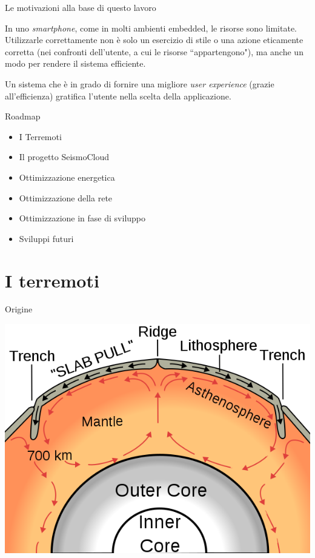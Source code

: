 
\begin{frame}[c]{Le motivazioni alla base di questo lavoro}

In uno \textit{smartphone}, come in molti ambienti embedded, le risorse sono limitate. Utilizzarle correttamente non è solo un esercizio di stile o una azione eticamente corretta (nei confronti dell'utente, a cui le risorse ``appartengono"), ma anche un modo per rendere il sistema efficiente.

\vspace{0.5cm}
Un sistema che è in grado di fornire una migliore \textit{user experience} (grazie all'efficienza) gratifica l'utente nella scelta della applicazione.

\end{frame}

\begin{frame}[c]{Roadmap}

\begin{itemize}
\item I Terremoti
\item Il progetto SeismoCloud
\item Ottimizzazione energetica
\item Ottimizzazione della rete
\item Ottimizzazione in fase di sviluppo
\item Sviluppi futuri
\end{itemize}

\end{frame}

\section{I terremoti}

\begin{frame}[c]{Origine}
\begin{center}
\includegraphics[scale=0.35]{introduzione/oceanic_spreading}
\end{center}
\end{frame}

